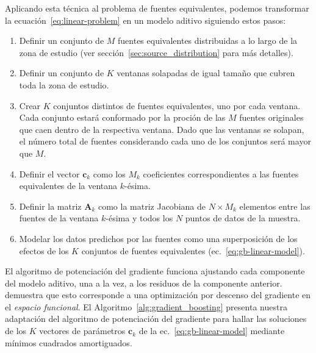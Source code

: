 Aplicando esta técnica al problema de fuentes equivalentes, podemos transformar
la ecuación~\ref{eq:linear-problem} en un modelo aditivo siguiendo estos
pasos:

\begin{enumerate}
  \item Definir un conjunto de $M$ fuentes equivalentes distribuidas a lo
      largo de la zona de estudio (ver sección~\ref{sec:source_distribution}
      para más detalles).
  \item Definir un conjunto de $K$ ventanas solapadas de igual tamaño que
      cubren toda la zona de estudio.
  \item Crear $K$ conjuntos distintos de fuentes equivalentes, uno por cada
      ventana.
      Cada conjunto estará conformado por la proción de las $M$ fuentes
      originales que caen dentro de la respectiva ventana.
      Dado que las ventanas se solapan, el número total de fuentes considerando
      cada uno de los conjuntos será mayor que $M$.
  \item Definir el vector $\mathbf{c}_k$ como los $M_k$ coeficientes
      correspondientes a las fuentes equivalentes de la ventana $k$-ésima.
  \item Definir la matriz $\mathbf{A}_k$ como la matriz Jacobiana de $N \times
      M_k$ elementos entre las fuentes de la ventana $k$-ésima y todos los $N$
      puntos de datos de la muestra.
  \item Modelar los datos predichos por las fuentes como una superposición de
      los efectos de los $K$ conjuntos de fuentes equivalentes
      (ec.~\ref{eq:gb-linear-model}).
\end{enumerate}

El algoritmo de potenciación del gradiente funciona ajustando cada componente
del modelo aditivo, una a la vez, a los residuos de la componente anterior.
\citet{friedman2001} demuestra que esto corresponde a una optimización por
descenso del gradiente en el \emph{espacio funcional}.
El Algoritmo~\ref{alg:gradient_boosting} presenta nuestra adaptación del
algoritmo de potenciación del gradiente para hallar las soluciones  de los $K$
vectores de parámetros $\mathbf{c}_k$ de la ec.~\ref{eq:gb-linear-model}
mediante mínimos cuadrados amortiguados.


